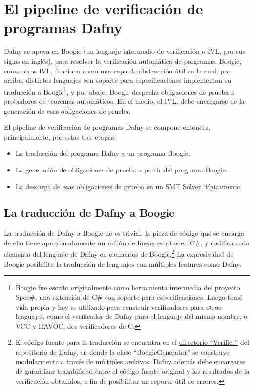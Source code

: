 \documentclass[12pt, a4paper, openany, fleqn]{book}
\begin{document}
    \chapter{El pipeline de verificación de programas Dafny} \label{ch:pipeline-dafny}

    Dafny se apoya en Boogie (un lenguaje intermedio de verificación o IVL, por sus siglas en inglés), para resolver la verificación automática de programas.
    Boogie, como otros IVL, funciona como una capa de abstracción útil en la cual, por arriba, distintos lenguajes con soporte para especificaciones implementan su traducción a Boogie\footnote{
        Boogie fue escrito originalmente como herramienta intermedia del proyecto Spec\#, una extensión de C\# con soporte para especificaciones. Luego tomó vida propia y hoy es utilizado para construir verificadores para otros lenguajes, como el verificador de Dafny para el lenguaje del mismo nombre, o VCC y HAVOC, dos verificadores de C.
    }, y por abajo, Boogie despacha obligaciones de prueba a probadores de teoremas automáticos. En el medio, el IVL, debe encargarse de la generación de esas obligaciones de prueba.

    El pipeline de verificación de programas Dafny se compone entonces, principalmente, por estas tres etapas:
    \begin{itemize}
        \item La traducción del programa Dafny a un programa Boogie.
        \item La generación de obligaciones de prueba a partir del programa Boogie.
        \item La descarga de esas obligaciones de prueba en un SMT Solver, típicamente.
    \end{itemize}

    \section{La traducción de Dafny a Boogie}
    La traducción de Dafny a Boogie no es trivial, la pieza de código que se encarga de ello tiene aproximadamente un millón de líneas escritas en C\#, y codifica cada elemento del lenguaje de Dafny en elementos de Boogie.\footnote{El código fuente para la traducción se encuentra en el \href{https://github.com/dafny-lang/dafny/tree/v4.7.0/Source/DafnyCore/Verifier}{directorio ``Verifier''} del repositorio de Dafny, en donde la clase ``BoogieGenerator'' se construye modularmente a través de múltiples archivos. Dafny además debe encargarse de garantizar trazabilidad entre el código fuente original y los resultados de la verificación obtenidos, a fin de posibilitar un reporte útil de errores.} La expresividad de Boogie posibilita la traducción de lenguajes con múltiples features como Dafny.
\end{document}
